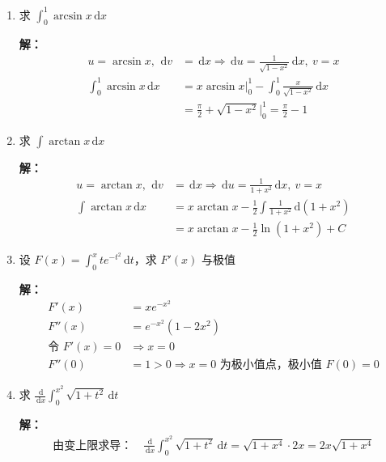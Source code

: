 \documentclass[12pt,a4paper]{article}
\newcommand{\dd}{\,\mathrm{d}}
\begin{document}
\begin{enumerate}[label=\textbf{\arabic*.}, leftmargin=*, itemsep=1.2em]
\textbf{解：}
\begin{align*}
\text{令 } t=\sqrt{x} &\Rightarrow x=t^2,\ \dd x=2t \dd t\\
\int e^{\sqrt{x}} \dd x &= 2\int t e^t \dd t = 2\left(t e^t - e^t\right) + C = 2e^{\sqrt{x}}(\sqrt{x}-1) + C
\end{align*}

\item 求 $\displaystyle \int_0^1 \arcsin x \dd x$

\textbf{解：}
\begin{align*}
u=\arcsin x,\ \dd v&=\dd x \Rightarrow \dd u=\frac{1}{\sqrt{1-x^2}}\dd x,\ v=x\\
\int_0^1 \arcsin x \dd x &= x\arcsin x\big|_0^1 - \int_0^1 \frac{x}{\sqrt{1-x^2}} \dd x\\
&= \frac{\pi}{2} + \sqrt{1-x^2}\big|_0^1 = \frac{\pi}{2} - 1
\end{align*}

\item 求 $\displaystyle \int \arctan x \dd x$

\textbf{解：}
\begin{align*}
u=\arctan x,\ \dd v&=\dd x \Rightarrow \dd u=\frac{1}{1+x^2}\dd x,\ v=x\\
\int \arctan x \dd x &= x\arctan x - \frac{1}{2}\int \frac{1}{1+x^2}\dd(1+x^2)\\
&= x\arctan x - \frac{1}{2}\ln(1+x^2) + C
\end{align*}

\item 设 $\displaystyle F(x)=\int_0^x te^{-t^2}\dd t$，求 $F'(x)$ 与极值

\textbf{解：}
\begin{align*}
F'(x) &= x e^{-x^2}\\
F''(x) &= e^{-x^2}(1-2x^2)\\
\text{令 } F'(x)=0 &\Rightarrow x=0\\
F''(0) &= 1>0 \Rightarrow x=0 \text{ 为极小值点，极小值 } F(0)=0
\end{align*}

\item 求 $\displaystyle \frac{\dd}{\dd x}\int_0^{x^2} \sqrt{1+t^2}\dd t$

\textbf{解：}
\begin{align*}
\text{由变上限求导：} \quad \frac{\dd}{\dd x}\int_0^{x^2} \sqrt{1+t^2}\dd t = \sqrt{1+x^4}\cdot 2x = 2x\sqrt{1+x^4}
\end{align*}


\end{enumerate}
\end{document}
